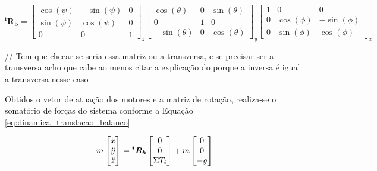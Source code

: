 \documentclass[main.tex]{subfiles}
\begin{document}
\begin{equation}\label{eq:rotational_matrix_raw}
    \boldsymbol{^iR_b} = 
     \begin{bmatrix}
        \cos(\psi)  &   -\sin(\psi) &   0\\
        \sin(\psi)  &   \cos(\psi)  &   0\\
        0           &   0           &   1
    \end{bmatrix}_z
    \begin{bmatrix}
        \cos(\theta)    &   0             &   \sin(\theta)  \\
        0               &   1               &   0           \\
        -\sin(\theta)   &   0             &   \cos(\theta)
    \end{bmatrix}_y
   \begin{bmatrix}
        1           &   0           &   0               \\
        0           &   \cos(\phi)  &   -\sin(\phi)   \\
        0           &   \sin(\phi)  &   \cos(\phi)
    \end{bmatrix}_x
\end{equation}

\textcolor{anotacao}{// Tem que checar se seria essa matriz ou a transversa, e se precisar ser a transversa acho que cabe ao menos citar a explicação do porque a inversa é igual a transversa nesse caso}

Obtidos o vetor de atuação dos motores e a matriz de rotação, realiza-se o somatório de forças do sistema conforme a Equação \ref{eq:dinamica_translacao_balanco}.

\begin{equation}\label{eq:dinamica_translacao_balanco}
    m \begin{bmatrix}
        \Ddot{x}\\
        \Ddot{y}\\
        \Ddot{z}
    \end{bmatrix} = \boldsymbol{^iR_b}
    \begin{bmatrix}
        0\\
        0\\
        \Sigma T_i 
    \end{bmatrix} + m
    \begin{bmatrix}
        0\\
        0\\
        -g
    \end{bmatrix}
\end{equation}
\end{document}
